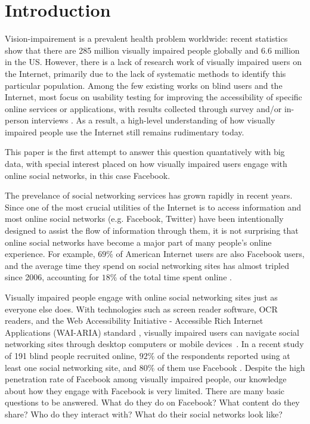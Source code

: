 \documentclass{sigchi}
\begin{document}


\section{Introduction}
Vision-impairement is a prevalent health problem worldwide:  recent statistics \cite{who_report, facts_about_blindness} show that there are 285 million visually impaired people globally and 6.6 million in the US. However, there is a lack of research work of visually impaired users on the Internet, primarily due to the lack of systematic methods to identify this particular population. Among the few existing works on blind users and the Internet, most focus on usability testing for improving the accessibility of specific  online services or applications, with results collected through survey and/or in-person interviews \cite{wentz2011, jayant2011, brady2013cscw, brady2013chi}.  As a result, a high-level understanding of how visually impaired people use the Internet still remains rudimentary today. 

This paper is the first attempt to answer this question quantatively with big data, with special interest placed on how visually impaired users engage with online social networks, in this case Facebook.


The prevelance of social networking services has grown rapidly in  recent years. Since one of the most crucial utilities of the Internet is to access information and most online social networks (e.g. Facebook, Twitter) have been intentionally designed to assist the flow of information through them, it is not surprising that online social networks have become a major part of many people's online experience. For example,  $69\%$ of American Internet users are also Facebook users, and the average time they spend on social networking sites has almost tripled since 2006, accounting for $18\%$ of the total time spent online \cite{facebook_wiki,facebook_stat_wiki,sociallyaware}.

Visually impaired people engage with online social networking sites just as everyone else does. With technologies such as screen reader software, OCR readers, and the Web Accessibility Initiative - Accessible Rich Internet Applications (WAI-ARIA) standard \cite{wai-aria}, visually impaired users can navigate social networking sites through desktop computers or mobile devices~\cite{wentz2011}.  In a recent study of 191 blind people recruited online, $92\%$ of the respondents reported using at least one social networking site, and $80\%$ of them use Facebook \cite{brady2013cscw}.  Despite the high penetration rate of Facebook among visually impaired people, our knowledge about how they engage with Facebook is very limited. There are many basic questions to be answered. What do they do on Facebook? What content do they share? Who do they interact with? What do their social networks look like? 
\end{document}
